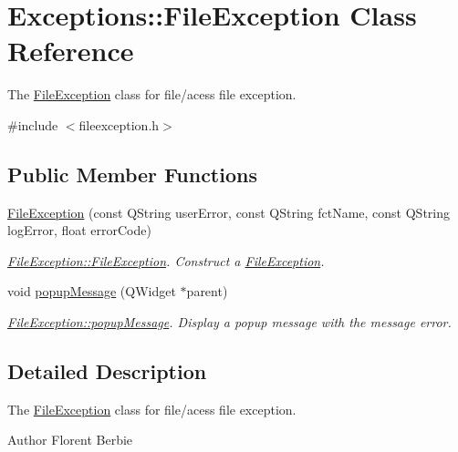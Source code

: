 \hypertarget{classExceptions_1_1FileException}{\section{Exceptions\-:\-:File\-Exception Class Reference}
\label{classExceptions_1_1FileException}
}


The \hyperlink{classExceptions_1_1FileException}{File\-Exception} class for file/acess file exception.  




{\ttfamily \#include $<$fileexception.\-h$>$}

\subsection*{Public Member Functions}
\begin{DoxyCompactItemize}
\item 
\hyperlink{classExceptions_1_1FileException_a30618a934ca08b2f37066be0b63b5a0e}{File\-Exception} (const Q\-String user\-Error, const Q\-String fct\-Name, const Q\-String log\-Error, float error\-Code)
\begin{DoxyCompactList}\small\item\em \hyperlink{classExceptions_1_1FileException_a30618a934ca08b2f37066be0b63b5a0e}{File\-Exception\-::\-File\-Exception}. Construct a \hyperlink{classExceptions_1_1FileException}{File\-Exception}. \end{DoxyCompactList}\item 
void \hyperlink{classExceptions_1_1FileException_aba824967d55e0a9a29c23521d87f05dd}{popup\-Message} (Q\-Widget $\ast$parent)
\begin{DoxyCompactList}\small\item\em \hyperlink{classExceptions_1_1FileException_aba824967d55e0a9a29c23521d87f05dd}{File\-Exception\-::popup\-Message}. Display a popup message with the message error. \end{DoxyCompactList}\end{DoxyCompactItemize}


\subsection{Detailed Description}
The \hyperlink{classExceptions_1_1FileException}{File\-Exception} class for file/acess file exception. 

\begin{DoxyAuthor}{Author}
Florent Berbie 
\end{DoxyAuthor}


